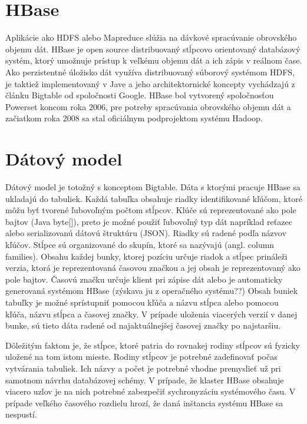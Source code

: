 \documentclass[11pt,twoside,a4paper]{book}
\begin{document}
\section*{HBase}


Aplikácie ako HDFS alebo Mapreduce slúžia na dávkové spracúvanie obrovského objemu dát. HBase je open source distribuovaný stĺpcovo orientovaný databázový systém, ktorý umožnuje prístup k veľkému objemu dát a ich zápis v reálnom čase. Ako perzistentné úložisko dát využíva distribuovaný súborový systémom HDFS, je taktiež implementovaný v Jave a jeho architektornické koncepty vychádzajú z článku Bigtable od spoločnosti Google. HBase bol vytvorený spoločnosťou Powerset koncom roka 2006, pre potreby spracúvania obrovského objemu dát \cite{White:2009:HDG:1717298} a začiatkom roka 2008 sa stal oficiálnym podprojektom systému Hadoop.

\section{Dátový model}

Dátový model je totožný s konceptom Bigtable. Dáta s ktorými pracuje HBase sa ukladajú do tabuliek. Každá tabuľka obsahuje riadky identifikované kľúčom, ktoré môžu byť tvorené ľubovoľným počtom stĺpcov. Klúče sú reprezentované ako pole bajtov (Java byte[]), preto je možné použiť ľubovoľný typ dát napríklad reťazec alebo serializovanú dátovú štruktúru (JSON). Riadky sú radené podľa názvov kľúčov. Stĺpce sú organizované do skupín, ktoré sa nazývajú  (angl. column families). Obsahu každej bunky, ktorej pozíciu určuje riadok a stĺpec prináleži verzia, ktorá je reprezentovaná časovou značkou a jej obsah je reprezentovaný ako pole bajtov. Časovú značku určuje klient pri zápise dát alebo je automaticky generovaná systémom HBase (zýskava ju z operačného systému??) Obsah buniek tabuľky je možné sprístupniť pomocou kľúča a názvu stĺpca alebo pomocou kľúča, názvu stĺpca a časovej značky. V prípade uloženia viacerých verzií v danej bunke, sú tieto dáta radené od najaktuálnejšej časovej značky po najstaršiu. 

Dôležitým faktom je, že stĺpce, ktoré patria do rovnakej rodiny stĺpcov sú fyzicky uložené na tom istom mieste. Rodiny stĺpcov je potrebné zadefinovať počas vytvárania tabuliek. Ich názvy a počet je potrebné vhodne premyslieť už pri samotnom návrhu databázovej schémy. V prípade, že klaster HBase obsahuje viacero uzlov je na nich potrebné zabezpečiť sychronyzáciu systémového času. V prípade veľkého časového rozdielu hrozí, že daná inštancia systému HBase sa nespustí.
\end{document}
